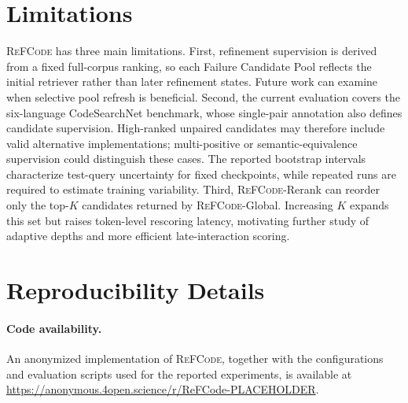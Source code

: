 \documentclass[11pt]{article}
\newcommand{\method}{\textsc{ReFCode}}
\begin{document}
\newpage
\section*{Limitations}

\method{} has three main limitations. First, refinement supervision is derived from a fixed full-corpus ranking, so each Failure Candidate Pool reflects the initial retriever rather than later refinement states. Future work can examine when selective pool refresh is beneficial. Second, the current evaluation covers the six-language CodeSearchNet benchmark, whose single-pair annotation also defines candidate supervision. High-ranked unpaired candidates may therefore include valid alternative implementations; multi-positive or semantic-equivalence supervision could distinguish these cases. The reported bootstrap intervals characterize test-query uncertainty for fixed checkpoints, while repeated runs are required to estimate training variability. Third, \method{}-Rerank can reorder only the top-\(K\) candidates returned by \method{}-Global. Increasing \(K\) expands this set but raises token-level rescoring latency, motivating further study of adaptive depths and more efficient late-interaction scoring.



\appendix
\flushbottom

\section{Reproducibility Details}
\label{app:experimental_details}

\paragraph{Code availability.}
An anonymized implementation of \method{}, together with the configurations and evaluation scripts used for the reported experiments, is available at \url{https://anonymous.4open.science/r/ReFCode-PLACEHOLDER}.
\end{document}
